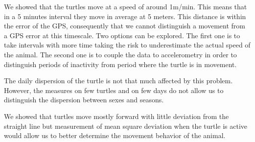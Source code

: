 \documentclass[10pt]{article}
\begin{document}
We showed that the turtles move at a speed of around 1m/min. This means that in a 5 minutes interval they move in average at 5 meters. This distance is within the error of the GPS, consequently that we cannot distinguish a movement from a GPS error at this timescale. Two options can be explored. The first one is to take intervals with more time taking the risk to underestimate the actual speed of the animal. The second one is to couple the data to accelerometry in order to distinguish periods of inactivity from period where the turtle is in movement.

The daily dispersion of the turtle is not that much affected by this problem. However, the measures on few turtles and on few days do not allow us to distinguish the dispersion between sexes and seasons.

We showed that turtles move mostly forward with little deviation from the straight line but measurement of mean square deviation when the turtle is active would allow us to better determine the movement behavior of the animal.
\end{document}

